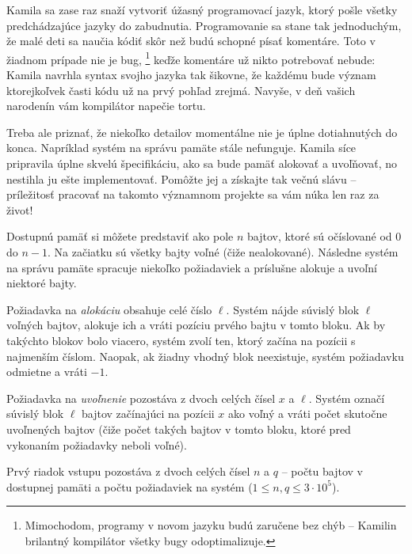 





Kamila sa zase raz snaží vytvoriť úžasný programovací jazyk, ktorý pošle všetky
predchádzajúce jazyky do zabudnutia. Programovanie sa stane tak jednoduchým, že
malé deti sa naučia kódiť skôr než budú schopné písať komentáre. Toto v žiadnom
prípade nie je bug,%
\footnote{Mimochodom, programy v novom jazyku budú zaručene bez chýb -- Kamilin
brilantný kompilátor všetky bugy odoptimalizuje.}
keďže komentáre už nikto potrebovať nebude: Kamila navrhla syntax svojho jazyka
tak šikovne, že každému bude význam ktorejkoľvek časti kódu už na prvý pohľad
zrejmá. Navyše, v deň vašich narodenín vám kompilátor napečie tortu.

Treba ale priznať, že niekoľko detailov momentálne nie je úplne dotiahnutých do
konca. Napríklad systém na správu pamäte stále nefunguje. Kamila síce pripravila
úplne skvelú špecifikáciu, ako sa bude pamäť alokovať a uvoľňovať, no nestihla
ju ešte implementovať. Pomôžte jej a získajte tak večnú slávu -- príležitosť
pracovať na takomto významnom projekte sa vám núka len raz za život!



Dostupnú pamäť si môžete predstaviť ako pole $n$ bajtov, ktoré sú očíslované od
$0$ do $n-1$. Na začiatku sú všetky bajty voľné (čiže nealokované). Následne
systém na správu pamäte spracuje niekoľko požiadaviek a príslušne alokuje a
uvoľní niektoré bajty.

Požiadavka na \emph{alokáciu} obsahuje celé číslo $\ell$. Systém nájde súvislý
blok $\ell$ voľných bajtov, alokuje ich a vráti pozíciu prvého bajtu v tomto
bloku. Ak by takýchto blokov bolo viacero, systém zvolí ten, ktorý začína na
pozícii s najmenším číslom. Naopak, ak žiadny vhodný blok neexistuje, systém
požiadavku odmietne a vráti $-1$.

Požiadavka na \emph{uvoľnenie} pozostáva z dvoch celých čísel $x$ a $\ell$.
Systém označí súvislý blok $\ell$ bajtov začínajúci na pozícii $x$ ako voľný a
vráti počet skutočne uvoľnených bajtov (čiže počet takých bajtov v tomto bloku,
ktoré pred vykonaním požiadavky neboli voľné).



Prvý riadok vstupu pozostáva z dvoch celých čísel $n$ a $q$ -- počtu bajtov v
dostupnej pamäti a počtu požiadaviek na systém ($1 \leq n, q \leq 3\cdot 10^5$).

